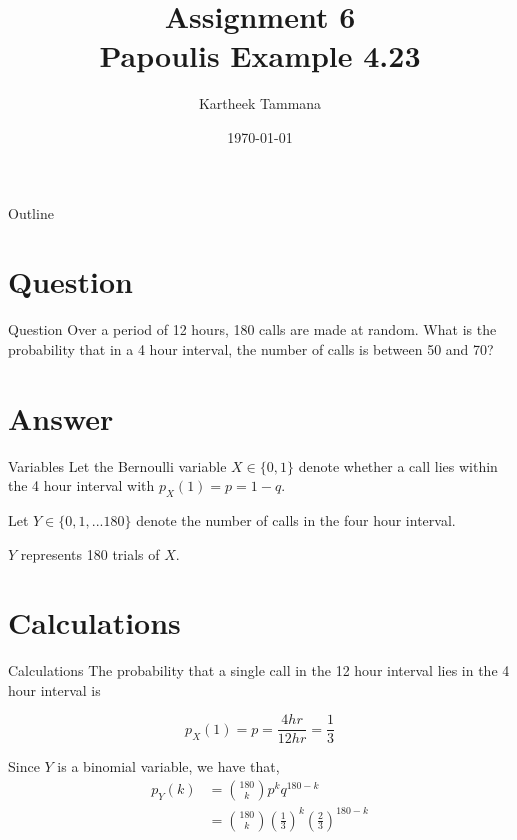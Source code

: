 \documentclass{beamer}
\title{Assignment 6 \\ Papoulis Example 4.23}
\author{Kartheek Tammana}
\date{\today}
\begin{document}
\begin{frame}
    \titlepage
\end{frame}

\logo{}

\begin{frame}{Outline}
    \tableofcontents
\end{frame}

\section{Question}
\begin{frame}{Question}
    Over a period of 12 hours, 180 calls are made at random. What is the probability that in a 4
    hour interval, the number of calls is between 50 and 70?
\end{frame}

\section{Answer}
\begin{frame}{Variables}
    Let the Bernoulli variable $X \in \{0, 1\}$ denote whether a call lies within the 4 hour
    interval with $p_X(1) = p = 1 - q$.

    Let $Y \in \{0, 1, ... 180\}$ denote the number of calls in the four hour interval.

    $Y$ represents 180 trials of $X$.
\end{frame}

\section{Calculations}
\begin{frame}{Calculations}
    The probability that a single call in the 12 hour interval lies in the 4 hour interval
    is

    \begin{equation}
        p_X(1) = p = \frac{4 hr}{12 hr} = \frac{1}{3}
    \end{equation}

    Since $Y$ is a binomial variable, we have that,
    \begin{align}
        p_Y(k) &= \binom{180}{k} p^{k} q^{180-k} \\
               &= \binom{180}{k} \left(\frac{1}{3}\right)^{k} \left(\frac{2}{3}\right)^{180-k}
    \end{align}
\end{frame}
\end{document}
